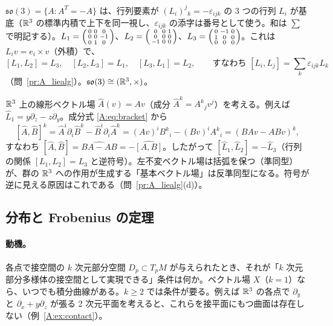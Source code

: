 \begin{ex}[$\mathfrak{so}(3)$]\label{A:ex:so3}
$\mathfrak{so}(3)=\{A:A^T=-A\}$ は、行列要素が $(L_i)^j{}_k=-\varepsilon_{ijk}$ の 3 つの行列 $L_i$ が基底（$\mathbb R^3$ の標準内積で上下を同一視し、$\varepsilon_{ijk}$ の添字は番号として使う。和は $\sum$ で明記する）。$L_1=\begin{psmallmatrix}0&0&0\\0&0&-1\\0&1&0\end{psmallmatrix}$、$L_2=\begin{psmallmatrix}0&0&1\\0&0&0\\-1&0&0\end{psmallmatrix}$、$L_3=\begin{psmallmatrix}0&-1&0\\1&0&0\\0&0&0\end{psmallmatrix}$。これは $L_iv=e_i\times v$（外積）で、
\[
[L_1,L_2]=L_3,\quad[L_2,L_3]=L_1,\quad[L_3,L_1]=L_2,\qquad\text{すなわち }[L_i,L_j]=\textstyle\sum_k\varepsilon_{ijk}L_k
\]
（問~\ref{pr:A_liealg}）。$\mathfrak{so}(3)\cong(\mathbb R^3,\times)$。
\end{ex}

\begin{rem}[符号に注意]
$\mathbb R^3$ 上の線形ベクトル場 $\hat A(v)=Av$（成分 $\hat A^k=A^k{}_jv^j$）を考える。例えば $\hat L_1=y\partial_z-z\partial_y$。成分式 \eqref{A:eq:bracket} から
\[
[\hat A,\hat B]^k=\hat A^i\partial_i\hat B^k-\hat B^i\partial_i\hat A^k=(Av)^iB^k{}_i-(Bv)^iA^k{}_i=(BAv-ABv)^k,
\]
すなわち $[\hat A,\hat B]=\widehat{BA-AB}=-\widehat{[A,B]}$。したがって $[\hat L_1,\hat L_2]=-\hat L_3$（行列の関係 $[L_1,L_2]=L_3$ と逆符号）。左不変ベクトル場は括弧を保つ（準同型）が、群の $\mathbb R^3$ への作用が生成する「基本ベクトル場」は反準同型になる。符号が逆に見える原因はこれである（問~\ref{pr:A_liealg}(d)）。
\end{rem}

\subsection{分布と Frobenius の定理}
\paragraph{動機。}各点で接空間の $k$ 次元部分空間 $D_p\subset T_pM$ が与えられたとき、それが「$k$ 次元部分多様体の接空間として実現できる」条件は何か。ベクトル場 $X$（$k=1$）なら、いつでも積分曲線がある。$k\ge2$ では条件が要る。例えば $\mathbb R^3$ の各点で $\partial_y$ と $\partial_x+y\partial_z$ が張る 2 次元平面を考えると、これらを接平面にもつ曲面は存在しない（例~\ref{A:ex:contact}）。

